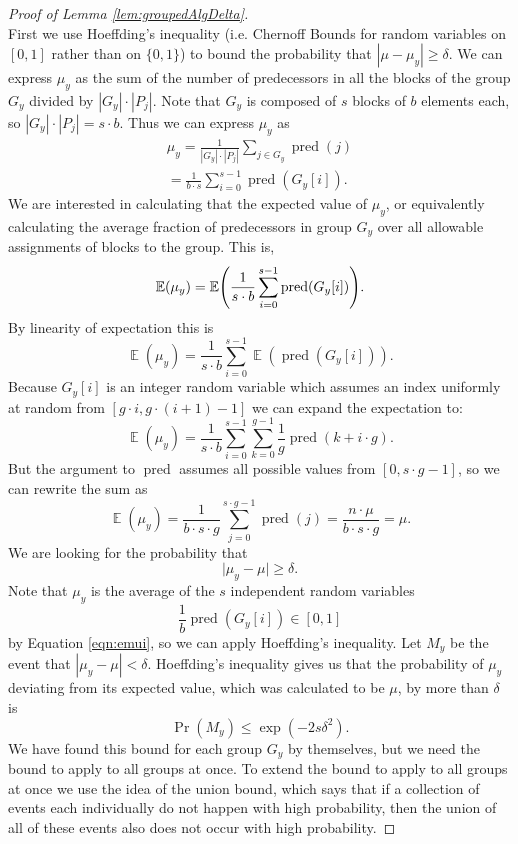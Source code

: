 \documentclass[twocolumn, twoside, 12pt]{article}
\def\pred{\operatorname{pred}}
\def\E{\operatorname{\mathbb{E}}}
\def\Pr{\operatorname{Pr}}
\DeclarePairedDelimiter{\paren}{(}{)}
\begin{document}
\begin{proof}[Proof of Lemma \ref{lem:groupedAlgDelta}]
$ $\\
First we use Hoeffding's inequality (i.e. Chernoff Bounds for random variables on $[0,1]$ rather than on $\{0,1\}$) to bound the probability that $|\mu - \mu_y| \geq \delta$. 
We can express $\mu_y$ as the sum of the number of predecessors in all the blocks of the group $G_y$ divided by $|G_y|\cdot|P_j|$.
Note that $G_y$ is composed of $s$ blocks of $b$ elements each, so $|G_y|\cdot|P_j| = s\cdot b$.
Thus we can express $\mu_y$ as \\
\begin{equation}
	\begin{split}
	\mu_y = \frac{1}{|G_y|\cdot|P_j|}\sum_{j \in G_y} \pred(j) \\
	= \frac{1}{b \cdot s}\sum_{i=0}^{s-1}\pred(G_y[i]).
	\end{split}
	\label{eqn:emui}
\end{equation}
We are interested in calculating that the expected value of $\mu_y$, or equivalently calculating the average fraction of predecessors in group $G_y$ over all allowable assignments of blocks to the group.
This is, 
$$\E(\mu_y) = \E\paren*{\frac{1}{s\cdot b} \sum_{i=0}^{s-1}\pred(G_y[i])}.$$
By linearity of expectation this is
$$\E(\mu_y) = \frac{1}{s\cdot b} \sum_{i=0}^{s-1}\E(\pred(G_y[i])).$$
Because $G_y[i]$ is an integer random variable which assumes an index uniformly at random from $[g \cdot i, g \cdot (i + 1) - 1]$ we can expand the expectation to:
$$\E(\mu_y) = \frac{1}{s\cdot b}\sum_{i=0}^{s-1}\sum_{k=0}^{g-1}\frac{1}{g}\pred(k+i\cdot g).$$
	But the argument to $\pred$ assumes all possible values from $[0, s\cdot g -1]$, so we can rewrite the sum as
$$\E(\mu_y) = \frac{1}{b\cdot s \cdot g}\sum_{j=0}^{s\cdot g-1}\pred(j) = \frac{n \cdot \mu}{b \cdot s \cdot g} = \mu.$$ 
We are looking for the probability that 
$$\Big | \mu_y - \mu \Big | \geq \delta.$$
	Note that $\mu_y$ is the average of the $s$ independent random variables $$\frac{1}{b}\pred(G_y[i]) \in [0, 1]$$ by Equation \eqref{eqn:emui}, so we can apply Hoeffding's inequality.
Let $M_y$ be the event that $|\mu_y-\mu| < \delta$. 
Hoeffding's inequality gives us that the probability of $\mu_y$ deviating from its expected value, which was calculated to be $\mu$, by more than $\delta$ is
	$$\Pr(M_y) \leq \exp(-2s\delta^2).$$
We have found this bound for each group $G_y$ by themselves, but we need the bound to apply to all groups at once. 
To extend the bound to apply to all groups at once we use the idea of the union bound, which says that if a collection of events each individually do not happen with high probability, then the union of all of these events also does not occur with high probability.

\end{proof}
\end{document}
